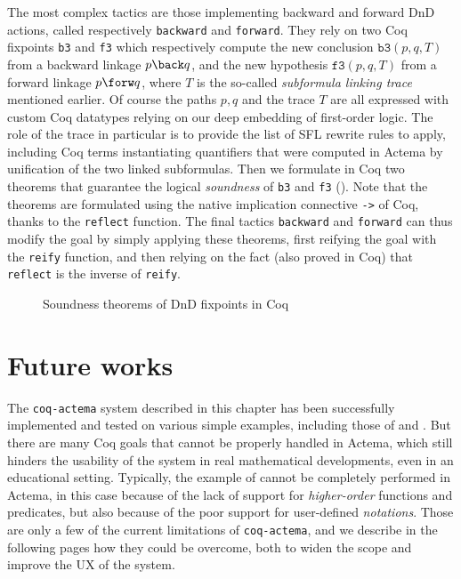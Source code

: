 The most complex tactics are those implementing backward and forward DnD
actions, called respectively \texttt{backward} and \texttt{forward}. They rely
on two Coq fixpoints \texttt{b3} and \texttt{f3} which respectively compute the
new conclusion $\mathtt{b3}(p, q, T)$ from a backward linkage $p \back q$, and
the new hypothesis $\mathtt{f3}(p, q, T)$ from a forward linkage $p \forw q$,
where $T$ is the so-called \emph{subformula linking trace} mentioned earlier. Of
course the paths $p, q$ and the trace $T$ are all expressed with custom Coq
datatypes relying on our deep embedding of first-order logic. The role of the
trace in particular is to provide the list of SFL rewrite rules to apply,
including Coq terms instantiating quantifiers that were computed in Actema by
unification of the two linked subformulas. Then we formulate in Coq two theorems
that guarantee the logical \emph{soundness} of \texttt{b3} and \texttt{f3}
(). Note that the theorems are formulated using the native
implication connective \texttt{->} of Coq, thanks to the \texttt{reflect}
function. The final tactics \texttt{backward} and \texttt{forward} can thus
modify the goal by simply applying these theorems, first reifying the goal with
the \texttt{reify} function, and then relying on the fact (also proved in Coq)
that \texttt{reflect} is the inverse of \texttt{reify}.

\begin{figure}
  
  \caption{Soundness theorems of DnD fixpoints in Coq}
\end{figure}



\section{Future works}

The \texttt{coq-actema} system described in this chapter has been successfully
implemented and tested on various simple examples, including those of
 and . But there are many Coq goals that cannot be
properly handled in Actema, which still hinders the usability of the system in
real mathematical developments, even in an educational setting. Typically, the
example of  cannot be completely performed in Actema, in this case
because of the lack of support for \emph{higher-order} functions and predicates,
but also because of the poor support for user-defined \emph{notations}. Those
are only a few of the current limitations of \texttt{coq-actema}, and we
describe in the following pages how they could be overcome, both to widen the
scope and improve the UX of the system.

